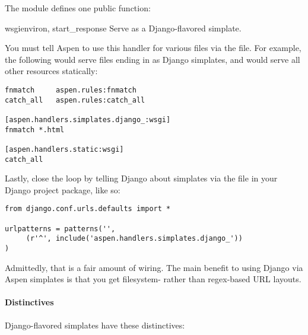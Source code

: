 The  module defines one public
function:

\begin{funcdesc}{wsgi}{environ, start_response} Serve
 as a Django-flavored simplate.\end{funcdesc}

You must tell Aspen to use this handler for various files via the
 file. For example, the following
 would serve files ending in  as Django
simplates, and would serve all other resources statically:

\begin{verbatim}
fnmatch     aspen.rules:fnmatch
catch_all   aspen.rules:catch_all

[aspen.handlers.simplates.django_:wsgi]
fnmatch *.html

[aspen.handlers.static:wsgi]
catch_all
\end{verbatim}

Lastly, close the loop by telling Django about simplates via the 
file in your Django project package, like so:

\begin{verbatim}
from django.conf.urls.defaults import *

urlpatterns = patterns('',
     (r'^', include('aspen.handlers.simplates.django_'))
)
\end{verbatim}

Admittedly, that is a fair amount of wiring. The main benefit to using Django
via Aspen simplates is that you get filesystem- rather than regex-based URL
layouts.


\paragraph{Distinctives}

Django-flavored simplates have these distinctives:

